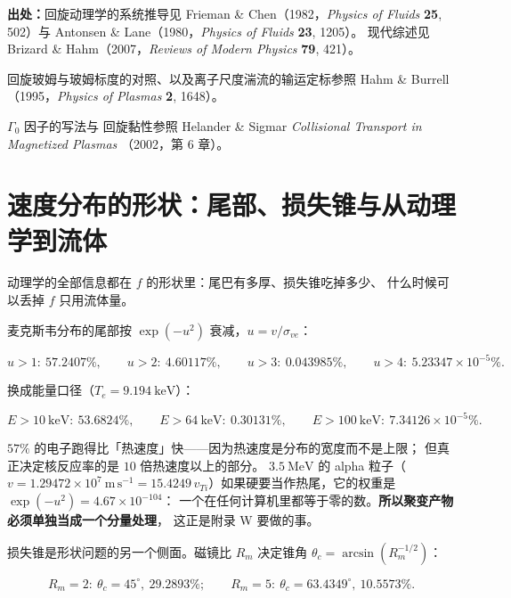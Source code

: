 {\footnotesize
\textbf{出处：}回旋动理学的系统推导见 Frieman \& Chen（1982，\emph{Physics of Fluids}
\textbf{25}, 502）与 Antonsen \& Lane（1980，\emph{Physics of Fluids} \textbf{23}, 1205）。
现代综述见 Brizard \& Hahm（2007，\emph{Reviews of Modern Physics} \textbf{79}, 421）。

回旋玻姆与玻姆标度的对照、以及离子尺度湍流的输运定标参照 Hahm \& Burrell
（1995，\emph{Physics of Plasmas} \textbf{2}, 1648）。

$\Gamma_0$ 因子的写法与
回旋黏性参照 Helander \& Sigmar \emph{Collisional Transport in Magnetized Plasmas}
（2002，第 6 章）。
}

\section{速度分布的形状：尾部、损失锥与从动理学到流体}
\label{sec:app-ae-tail}

动理学的全部信息都在 $f$ 的形状里：尾巴有多厚、损失锥吃掉多少、
什么时候可以丢掉 $f$ 只用流体量。

麦克斯韦分布的尾部按 $\exp(-u^2)$ 衰减，$u=v/\sigma_{ve}$：

\begin{equation}
u>1:\ 57.2407\%,\qquad
u>2:\ 4.60117\%,\qquad
u>3:\ 0.043985\%,\qquad
u>4:\ 5.23347\times10^{-5}\% .
\label{eq:app-ae-tail}
\end{equation}

换成能量口径（$T_e=9.194\ \mathrm{keV}$）：

\begin{equation}
E>10\ \mathrm{keV}:\ 53.6824\%,\qquad
E>64\ \mathrm{keV}:\ 0.30131\%,\qquad
E>100\ \mathrm{keV}:\ 7.34126\times10^{-5}\% .
\label{eq:app-ae-energytail}
\end{equation}

$57\%$ 的电子跑得比「热速度」快——因为热速度是分布的宽度而不是上限；
但真正决定核反应率的是 $10$ 倍热速度以上的部分。
$3.5\ \mathrm{MeV}$ 的 alpha 粒子（$v=1.29472\times10^{7}\ \mathrm{m\,s^{-1}}
=15.4249\,v_{Ti}$）如果硬要当作热尾，它的权重是 $\exp(-u^2)=4.67\times10^{-104}$：
一个在任何计算机里都等于零的数。\textbf{所以聚变产物必须单独当成一个分量处理}，
这正是附录 W 要做的事。

损失锥是形状问题的另一个侧面。磁镜比 $R_m$ 决定锥角 $\theta_c=\arcsin(R_m^{-1/2})$：

\begin{equation}
R_m=2:\ \theta_c=45^\circ,\ 29.2893\%;\qquad
R_m=5:\ \theta_c=63.4349^\circ,\ 10.5573\% .
\label{eq:app-ae-losscone}
\end{equation}


